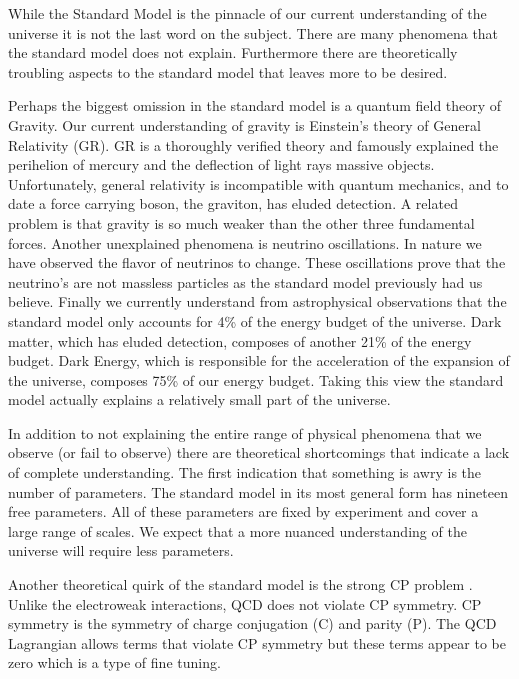 
While the Standard Model is the pinnacle of our current understanding of the universe it is not the last word on the subject.
There are many phenomena that the standard model does not explain.
Furthermore there are theoretically troubling aspects to the standard model that leaves more to be desired.

Perhaps the biggest omission in the standard model is a quantum field theory of Gravity.
Our current understanding of gravity is Einstein's theory of General Relativity (GR).
GR is a thoroughly verified theory and famously explained the perihelion of mercury and the deflection of light rays massive objects.
Unfortunately, general relativity is incompatible with quantum mechanics, and to date a force carrying boson, the graviton, has eluded detection.
A related problem is that gravity is so much weaker than the other three fundamental forces.
Another unexplained phenomena is neutrino oscillations.
In nature we have observed the flavor of neutrinos to change.
These oscillations prove that the neutrino's are not massless particles as the standard model previously had us believe.
Finally we currently understand from astrophysical observations that the standard model only accounts for 4\% of the energy budget of the universe.
Dark matter, which has eluded detection, composes of another 21\% of the energy budget.
Dark Energy, which is responsible for the acceleration of the expansion of the universe, composes 75\% of our energy budget.
Taking this view the standard model actually explains a relatively small part of the universe.

In addition to not explaining the entire range of physical phenomena that we observe (or fail to observe) there are theoretical shortcomings that indicate a lack of complete understanding.
The first indication that something is awry is the number of parameters.
The standard model in its most general form has nineteen free parameters.
All of these parameters are fixed by experiment and cover a large range of scales.
We expect that a more nuanced understanding of the universe will require less parameters.

Another theoretical quirk of the standard model is the strong CP problem \cite{Dine:strongcp}.
Unlike the electroweak interactions, QCD does not violate CP symmetry.
CP symmetry is the symmetry of charge conjugation (C) and parity (P).
The QCD Lagrangian allows terms that violate CP symmetry but these terms appear to be zero which is a type of fine tuning.

